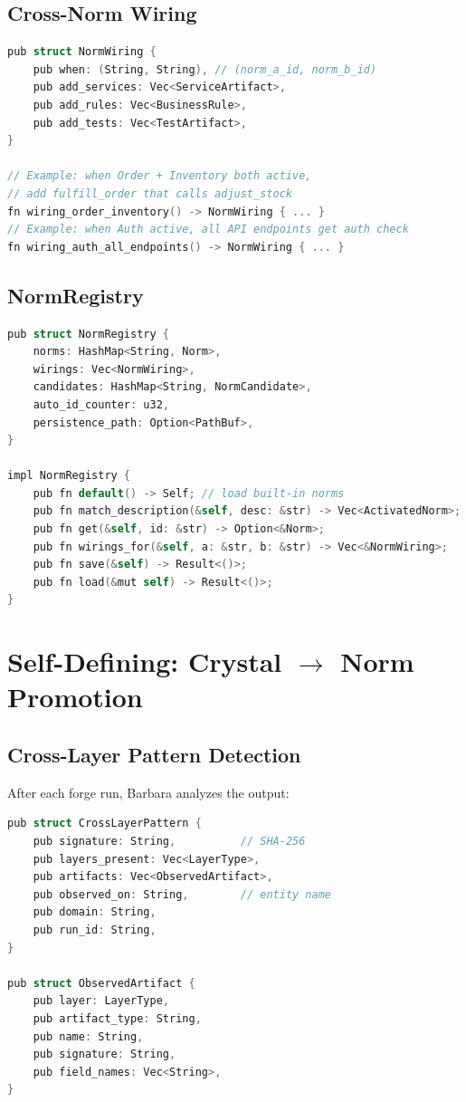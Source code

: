 \documentclass[11pt,a4paper]{article}
\begin{document}
\subsection{Cross-Norm Wiring}

\begin{lstlisting}[language=C]
pub struct NormWiring {
    pub when: (String, String), // (norm_a_id, norm_b_id)
    pub add_services: Vec<ServiceArtifact>,
    pub add_rules: Vec<BusinessRule>,
    pub add_tests: Vec<TestArtifact>,
}

// Example: when Order + Inventory both active,
// add fulfill_order that calls adjust_stock
fn wiring_order_inventory() -> NormWiring { ... }
// Example: when Auth active, all API endpoints get auth check
fn wiring_auth_all_endpoints() -> NormWiring { ... }
\end{lstlisting}

\subsection{NormRegistry}

\begin{lstlisting}[language=C]
pub struct NormRegistry {
    norms: HashMap<String, Norm>,
    wirings: Vec<NormWiring>,
    candidates: HashMap<String, NormCandidate>,
    auto_id_counter: u32,
    persistence_path: Option<PathBuf>,
}

impl NormRegistry {
    pub fn default() -> Self; // load built-in norms
    pub fn match_description(&self, desc: &str) -> Vec<ActivatedNorm>;
    pub fn get(&self, id: &str) -> Option<&Norm>;
    pub fn wirings_for(&self, a: &str, b: &str) -> Vec<&NormWiring>;
    pub fn save(&self) -> Result<()>;
    pub fn load(&mut self) -> Result<()>;
}
\end{lstlisting}

\section{Self-Defining: Crystal $\to$ Norm Promotion}

\subsection{Cross-Layer Pattern Detection}

After each forge run, Barbara analyzes the output:

\begin{lstlisting}[language=C]
pub struct CrossLayerPattern {
    pub signature: String,          // SHA-256
    pub layers_present: Vec<LayerType>,
    pub artifacts: Vec<ObservedArtifact>,
    pub observed_on: String,        // entity name
    pub domain: String,
    pub run_id: String,
}

pub struct ObservedArtifact {
    pub layer: LayerType,
    pub artifact_type: String,
    pub name: String,
    pub signature: String,
    pub field_names: Vec<String>,
}
\end{lstlisting}
\end{document}
